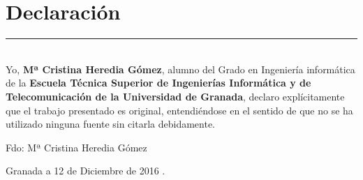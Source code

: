 \chapter*{Declaración}

\noindent\rule[-1ex]{\textwidth}{2pt}\\[4.5ex]

Yo, \textbf{Mª Cristina Heredia Gómez}, alumno del Grado en Ingeniería informática de la \textbf{Escuela Técnica Superior
de Ingenierías Informática y de Telecomunicación de la Universidad de Granada}, declaro explícitamente que el trabajo presentado es original,
entendiéndose en el sentido de que no se ha utilizado ninguna fuente
sin citarla debidamente.

\vspace{6cm}

\noindent Fdo: Mª Cristina Heredia Gómez

\vspace{2cm}

\begin{flushright}
Granada a 12 de Diciembre de 2016 .
\end{flushright}



